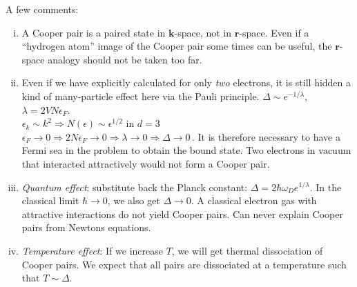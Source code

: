 A few comments:
\begin{enumerate}[(i)]
  \item A Cooper pair is a paired state in $\bm k$-space, not in $\bm r$-space.
        Even if a ``hydrogen atom'' image of the Cooper pair some times can be useful, the $\bm r$-space analogy should not be taken too far.
  \item Even if we have explicitly calculated for only \emph{two} electrons, it is still hidden a kind of many-particle effect here via the Pauli principle.
        $\Delta \sim e^{-1/\lambda}$, $\lambda = 2VN\epsilon_F$. \\
        $\epsilon_k \sim k^2 \Rightarrow N(\epsilon) \sim \epsilon^{1/2}$ in $d=3$\\
        $\epsilon_F \rightarrow 0 \Rightarrow 2N\epsilon_F \rightarrow 0 \Rightarrow \lambda \rightarrow 0 \Rightarrow \Delta \rightarrow 0$\,.
        It is therefore necessary to have a Fermi sea in the problem to obtain the bound state.
        Two electrons in vacuum that interacted attractively would not form a Cooper pair.
  \item \emph{Quantum effect}: substitute back the Planck constant: $\Delta = 2\hbar \omega_D e^{1/\lambda}$. 
        In the classical limit $\hbar \rightarrow 0$, we also get $\Delta \rightarrow 0$.
        A classical electron gas with attractive interactions do not yield Cooper pairs.
        Can never explain Cooper pairs from Newtons equations.
  \item \emph{Temperature effect}: If we increase $T$, we will get thermal dissociation of Cooper pairs.
        We expect that all pairs are dissociated at a temperature such that $T \sim \Delta$.
\end{enumerate}





\clearpage
